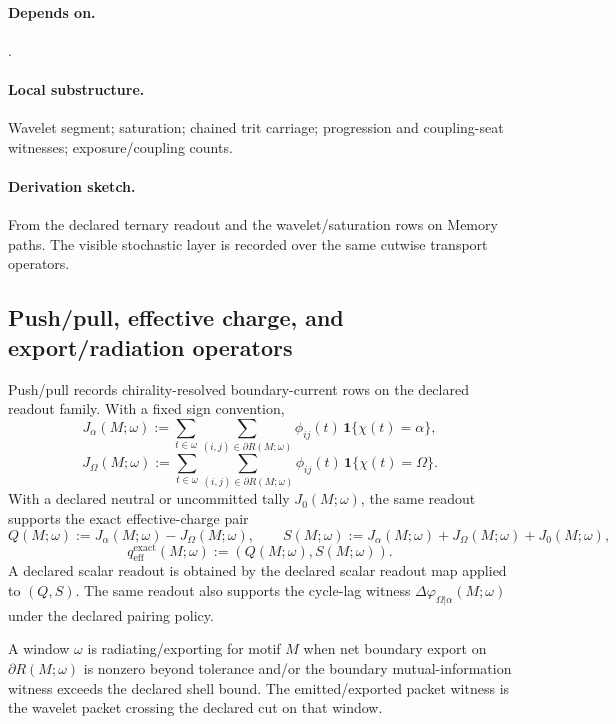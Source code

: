 \paragraph{Depends on.} .
\paragraph{Local substructure.} Wavelet segment; saturation; chained trit carriage; progression and coupling-seat witnesses; exposure/coupling counts.
\paragraph{Derivation sketch.} From the declared ternary readout and the wavelet/saturation rows on Memory paths. The visible stochastic layer is recorded over the same cutwise transport operators.

\subsection{Push/pull, effective charge, and export/radiation operators}\label{subsec:pushpull-export-operators}
\begin{definition}
\label{def:push-pull-operator}
Push/pull records chirality-resolved boundary-current rows on the declared readout family. With a fixed sign convention,
\[
J_\alpha(M;\omega):=\sum_{t\in\omega}\sum_{(i,j)\in\partial R(M;\omega)} \phi_{ij}(t)\,\mathbf 1\{\chi(t)=\alpha\},
\]
\[
J_\Omega(M;\omega):=\sum_{t\in\omega}\sum_{(i,j)\in\partial R(M;\omega)} \phi_{ij}(t)\,\mathbf 1\{\chi(t)=\Omega\}.
\]
With a declared neutral or uncommitted tally $J_0(M;\omega)$, the same readout supports the exact effective-charge pair
\[
Q(M;\omega):=J_\alpha(M;\omega)-J_\Omega(M;\omega),
\qquad
S(M;\omega):=J_\alpha(M;\omega)+J_\Omega(M;\omega)+J_0(M;\omega),
\]
\[
q_{\mathrm{eff}}^{\mathrm{exact}}(M;\omega):=(Q(M;\omega),S(M;\omega)).
\]
A declared scalar readout is obtained by the declared scalar readout map applied to $(Q,S)$. The same readout also supports the cycle-lag witness $\Delta\varphi_{\Omega|\alpha}(M;\omega)$ under the declared pairing policy.
\end{definition}

\begin{definition}
\label{def:radiation-operator}
A window $\omega$ is radiating/exporting for motif $M$ when net boundary export on $\partial R(M;\omega)$ is nonzero beyond tolerance and/or the boundary mutual-information witness exceeds the declared shell bound. The emitted/exported packet witness is the wavelet packet crossing the declared cut on that window.
\end{definition}

